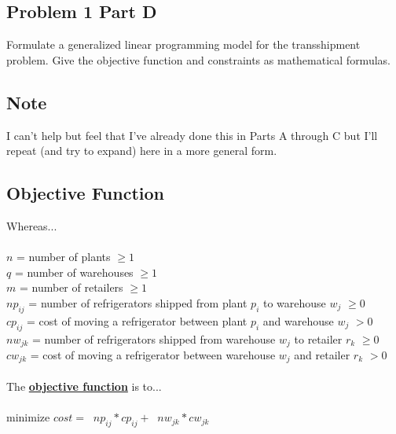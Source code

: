 \documentclass[../report/main.tex]{subfiles}
\begin{document}
\subsection*{Problem 1 Part D}
Formulate a generalized linear programming model for the transshipment problem. Give the objective function and constraints as mathematical formulas.

\subsection*{Note}
I can't help but feel that I've already done this in Parts A through C but I'll repeat (and try to expand) here in a more general form.

\subsection*{Objective Function}
Whereas...\\\\\indent$n$ = number of plants $\geq 1$\\\indent$q$ = number of warehouses $\geq 1$\\\indent$m$ = number of retailers $\geq 1$\\\indent$np_{ij}$ = number of refrigerators shipped from plant $p_i$ to warehouse $w_j$ $\geq 0$\\\indent$cp_{ij}$ = cost of moving a refrigerator between plant $p_i$ and warehouse $w_j$ $> 0$\\\indent$nw_{jk}$ = number of refrigerators shipped from warehouse $w_j$ to retailer $r_k$ $\geq 0$\\\indent$cw_{jk}$ = cost of moving a refrigerator between warehouse $w_j$ and retailer $r_k$ $> 0$\\\\The \textbf{\underline{objective function}} is to...
\\\\\indent minimize $cost = \mathop{\sum_{i=1}^{n}\sum_{j=1}^{q}}np_{ij}*cp_{ij} +  \mathop{\sum_{j=1}^{q}\sum_{k=1}^{m}}nw_{jk}*cw_{jk}$
\end{document}
